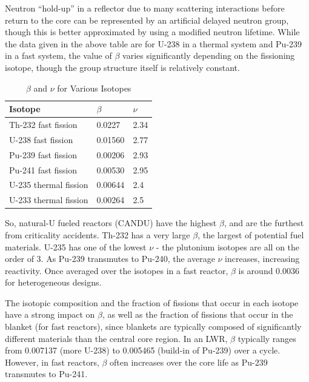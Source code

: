 \documentclass[10pt]{article}
\begin{document}
\begin{flushleft}
Neutron ``hold-up'' in a reflector due to many scattering interactions before return to the core can be represented by an artificial delayed neutron group, though this is better approximated by using a modified neutron lifetime. While the data given in the above table are for U-238 in a thermal system and Pu-239 in a fast system, the value of \(\beta\) varies significantly depending on the fissioning isotope, though the group structure itself is relatively constant. 

\begin{table}[H] 
\caption{\(\beta\) and \(\nu\) for Various Isotopes} %
\centering %
\begin{tabular}{l l l} %
\hline\hline %
 Isotope & \(\beta\) & \(\nu\)
\\ [0.5ex]
\hline %
Th-232 fast fission & 0.0227 & 2.34\\
U-238 fast fission & 0.01560 & 2.77\\
Pu-239 fast fission & 0.00206 & 2.93\\
Pu-241 fast fission & 0.00530 & 2.95\\
U-235 thermal fission & 0.00644 & 2.4\\
U-233 thermal fission & 0.00264 & 2.5\\
\hline %
\end{tabular}
\label{tab:PPer}
\end{table}

So, natural-U fueled reactors (CANDU) have the highest \(\beta\), and are the furthest from criticality accidents. Th-232 has a very large \(\beta\), the largest of potential fuel materials. U-235 has one of the lowest \(\nu\) - the plutonium isotopes are all on the order of 3. As Pu-239 transmutes to Pu-240, the average \(\nu\) increases, increasing reactivity. Once averaged over the isotopes in a fast reactor, \(\beta\) is around 0.0036 for heterogeneous designs.

The isotopic composition and the fraction of fissions that occur in each isotope have a strong impact on \(\beta\), as well as the fraction of fissions that occur in the blanket (for fast reactors), since blankets are typically composed of significantly different materials than the central core region.  In an LWR, \(\beta\) typically ranges from 0.007137 (more U-238) to 0.005465 (build-in of Pu-239) over a cycle. However, in fast reactors, \(\beta\) often increases over the core life as Pu-239 transmutes to Pu-241.


\end{flushleft}
\end{document}
